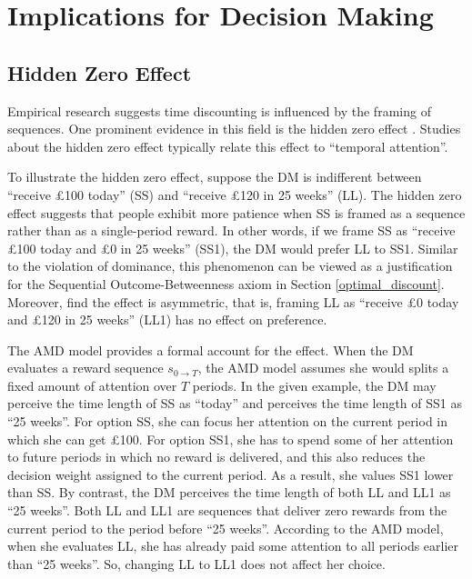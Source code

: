 \documentclass[
  12pt,
]{article}
\begin{document}
\hypertarget{implications-for-decision-making}{%
\section{\texorpdfstring{Implications for Decision Making
\label{implication}}{Implications for Decision Making }}\label{implications-for-decision-making}}

\hypertarget{hidden-zero-effect}{%
\subsection{\texorpdfstring{Hidden Zero Effect
\label{hidden_zero}}{Hidden Zero Effect }}\label{hidden-zero-effect}}

Empirical research suggests time discounting is influenced by the
framing of sequences. One prominent evidence in this field is the hidden
zero effect
\citep{magen2008hidden, radu2011mechanism, read2017value, dang2021beauty}.
Studies about the hidden zero effect typically relate this effect to
``temporal attention''.

To illustrate the hidden zero effect, suppose the DM is indifferent
between ``receive £100 today'' (SS) and ``receive £120 in 25 weeks''
(LL). The hidden zero effect suggests that people exhibit more patience
when SS is framed as a sequence rather than as a single-period reward.
In other words, if we frame SS as ``receive £100 today and £0 in 25
weeks'' (SS1), the DM would prefer LL to SS1. Similar to the violation
of dominance, this phenomenon can be viewed as a justification for the
Sequential Outcome-Betweenness axiom in Section \ref{optimal_discount}.
Moreover, \citet{read2017value} find the effect is asymmetric, that is,
framing LL as ``receive £0 today and £120 in 25 weeks'' (LL1) has no
effect on preference.

The AMD model provides a formal account for the effect. When the DM
evaluates a reward sequence \(s_{0\rightarrow T}\), the AMD model
assumes she would splits a fixed amount of attention over \(T\) periods.
In the given example, the DM may perceive the time length of SS as
``today'' and perceives the time length of SS1 as ``25 weeks''. For
option SS, she can focus her attention on the current period in which
she can get £100. For option SS1, she has to spend some of her attention
to future periods in which no reward is delivered, and this also reduces
the decision weight assigned to the current period. As a result, she
values SS1 lower than SS. By contrast, the DM perceives the time length
of both LL and LL1 as ``25 weeks''. Both LL and LL1 are sequences that
deliver zero rewards from the current period to the period before ``25
weeks''. According to the AMD model, when she evaluates LL, she has
already paid some attention to all periods earlier than ``25 weeks''.
So, changing LL to LL1 does not affect her choice.
\end{document}
